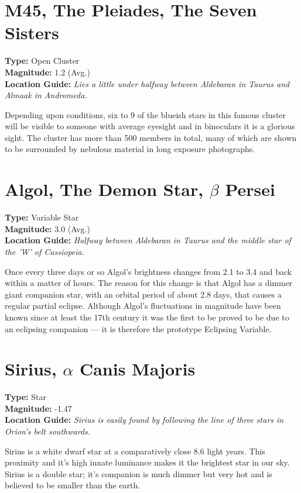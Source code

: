 \section{M45, The Pleiades, The Seven Sisters}
\textbf{Type:} Open Cluster \\
\textbf{Magnitude:} 1.2 (Avg.) \\
\textbf{Location Guide:} \textit{Lies a little under halfway between Aldebaran in Taurus and Almaak in Andromeda.} 

Depending upon conditions, six to 9 of the blueish stars in this famous cluster will be visible to someone with average eyesight and in binoculars it is a glorious sight. The cluster has more than 500 members in total, many of which are shown to be surrounded by nebulous material in long exposure photographs. 

\section{Algol, The Demon Star, $\beta$ Persei}
\textbf{Type:} Variable Star \\
\textbf{Magnitude:} 3.0 (Avg.) \\
\textbf{Location Guide:} \textit{Halfway between Aldebaran in Taurus and the middle star of the 'W' of Cassiopeia.}

Once every three days or so Algol's brightness changes from 2.1 to 3.4 and back within a matter of hours. The reason for this change is that Algol has a dimmer giant companion star, with an orbital period of about 2.8 days, that causes a regular partial eclipse. Although Algol's fluctuations in magnitude have been known since at least the 17th century it was the first to be proved to be due to an eclipsing companion --- it is therefore the prototype Eclipsing Variable. 

\section{Sirius, $\alpha$ Canis Majoris}
\textbf{Type:} Star \\
\textbf{Magnitude:} -1.47 \\
\textbf{Location Guide:} \textit{Sirius is easily found by following the line of three stars in Orion's belt southwards.} 

Sirius is a white dwarf star at a comparatively close 8.6 light years. This proximity and it's high innate luminance makes it the brightest star in our sky. Sirius is a double star; it's companion is much dimmer but very hot and is believed to be smaller than the earth. 

